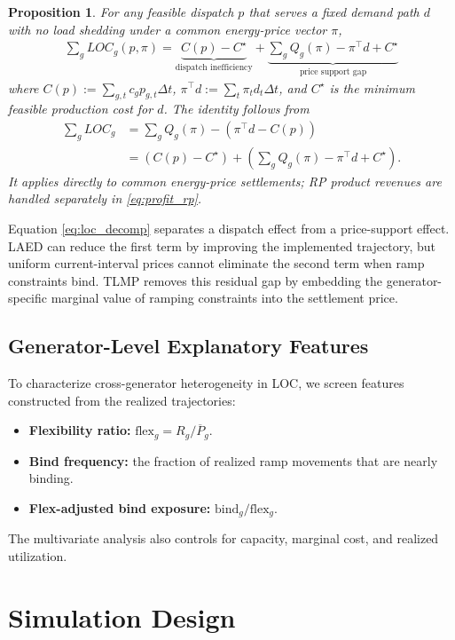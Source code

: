 \documentclass[conference]{IEEEtran}
\newtheorem{proposition}{Proposition}
\begin{document}
\begin{proposition}\label{prop:loc_decomp}
For any feasible dispatch $p$ that serves a fixed demand path $d$ with no load shedding under a common energy-price vector $\pi$,
\begin{align}
\sum_g LOC_g(p,\pi)
=
\underbrace{C(p)-C^\star}_{\text{dispatch inefficiency}}
+
\underbrace{\sum_g Q_g(\pi)-\pi^\top d + C^\star}_{\text{price support gap}}
\label{eq:loc_decomp}
\end{align}
where $C(p):=\sum_{g,t} c_g p_{g,t}\Delta t$, $\pi^\top d:=\sum_t\pi_t d_t\Delta t$, and $C^\star$ is the minimum feasible production cost for $d$. The identity follows from
\begin{align}
\sum_g LOC_g
&=\sum_g Q_g(\pi)-\left(\pi^\top d-C(p)\right) \nonumber\\
&=\left(C(p)-C^\star\right)
+\left(\sum_g Q_g(\pi)-\pi^\top d+C^\star\right). \nonumber
\end{align}
It applies directly to common energy-price settlements; RP product revenues are handled separately in \eqref{eq:profit_rp}.
\end{proposition}

Equation \ref{eq:loc_decomp} separates a dispatch effect from a price-support effect. LAED can reduce the first term by improving the implemented trajectory, but uniform current-interval prices cannot eliminate the second term when ramp constraints bind. TLMP removes this residual gap by embedding the generator-specific marginal value of ramping constraints into the settlement price.

\subsection{Generator-Level Explanatory Features}
To characterize cross-generator heterogeneity in LOC, we screen features constructed from the realized trajectories:
\begin{itemize}
    \item \textbf{Flexibility ratio:} $\mathrm{flex}_g=R_g/\overline P_g$.
    \item \textbf{Bind frequency:} the fraction of realized ramp movements that are nearly binding.
    \item \textbf{Flex-adjusted bind exposure:} $\mathrm{bind}_g/\mathrm{flex}_g$.
\end{itemize}
The multivariate analysis also controls for capacity, marginal cost, and realized utilization.

\section{Simulation Design}
\label{sec:setup}
\end{document}

